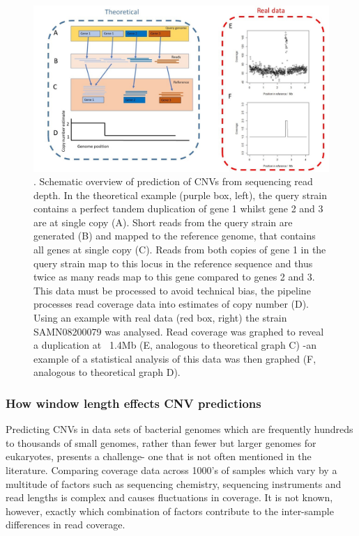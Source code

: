 \documentclass{article}
\begin{document}
\begin{figure}[h!]
\centering
\includegraphics[width=\textwidth{}]{Chapter_1/intro ting.jpg}
\caption{. Schematic overview of prediction of CNVs from sequencing read depth. In the theoretical example (purple box, left), the query strain contains a perfect tandem duplication of gene 1 whilst gene 2 and 3 are at single copy (A). Short reads from the query strain are generated (B) and mapped to the reference genome, that contains all genes at single copy (C). Reads from both copies of gene 1 in the query strain map to this locus in the reference sequence and thus twice as many reads map to this gene compared to genes 2 and 3. This data must be processed to avoid technical bias, the pipeline processes read coverage data into estimates of copy number (D). Using an example with real data (red box, right) the strain SAMN08200079 was analysed. Read coverage was graphed to reveal a duplication at ~1.4Mb (E, analogous to theoretical graph C) -an example of a statistical analysis of this data was then graphed (F, analogous to theoretical graph D).  }
\label{fig:Schematic_graph}
\end{figure}


\subsubsection{How window length effects CNV predictions}

Predicting CNVs in data sets of bacterial genomes which are frequently hundreds to thousands of small genomes, rather than fewer but larger genomes for eukaryotes, presents a challenge- one that is not often mentioned in the literature. Comparing coverage data across 1000's of samples which vary by a multitude of factors such as sequencing chemistry, sequencing instruments and read lengths is complex and causes fluctuations in coverage. It is not known, however, exactly which combination of factors contribute to the inter-sample differences in read coverage.
\end{document}

